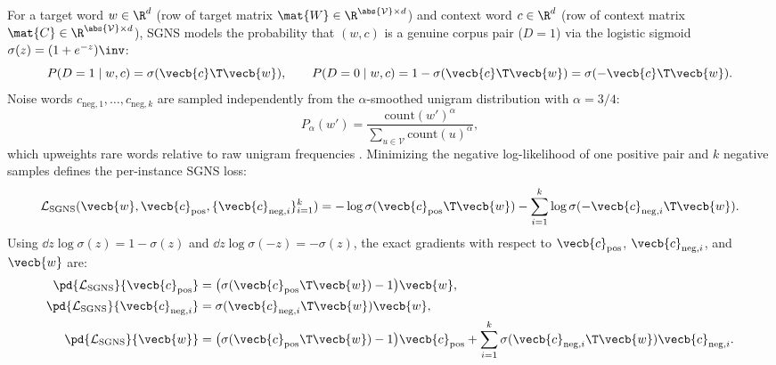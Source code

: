 \documentclass[../../../../master.tex]{subfiles}
\begin{document}
\begin{coremath}
For a target word $w \in \R^d$ (row of target matrix $\mat{W} \in \R^{\abs{\mathcal{V}}\times d}$) and context word $c \in \R^d$ (row of context matrix $\mat{C} \in \R^{\abs{\mathcal{V}}\times d}$), SGNS models the probability that $(w, c)$ is a genuine corpus pair ($D=1$) via the logistic sigmoid $\sigma(z) = (1 + e^{-z})\inv$:
\begin{equation}
  P(D=1 \mid w, c) = \sigma(\vecb{c}\T \vecb{w}), \qquad P(D=0 \mid w, c) = 1 - \sigma(\vecb{c}\T \vecb{w}) = \sigma(-\vecb{c}\T \vecb{w}).
  \label{eq:tok:sgns_prob}
\end{equation}
Noise words $c_{\mathrm{neg}, 1}, \dots, c_{\mathrm{neg}, k}$ are sampled independently from the $\alpha$-smoothed unigram distribution with $\alpha = 3/4$:
\begin{equation}
  P_\alpha(w') = \frac{\mathrm{count}(w')^\alpha}{\sum_{u \in \mathcal{V}} \mathrm{count}(u)^\alpha},
  \label{eq:tok:noise_dist}
\end{equation}
which upweights rare words relative to raw unigram frequencies . Minimizing the negative log-likelihood of one positive pair and $k$ negative samples defines the per-instance SGNS loss:
\begin{equation}
  \mathcal{L}_{\mathrm{SGNS}}(\vecb{w}, \vecb{c}_{\mathrm{pos}}, \{\vecb{c}_{\mathrm{neg},i}\}_{i=1}^k)
  = -\log \sigma(\vecb{c}_{\mathrm{pos}}\T \vecb{w}) - \sum_{i=1}^k \log \sigma(-\vecb{c}_{\mathrm{neg},i}\T \vecb{w}).
  \label{eq:tok:sgns_loss}
\end{equation}
Using $\dd{}{z}\log\sigma(z) = 1 - \sigma(z)$ and $\dd{}{z}\log\sigma(-z) = -\sigma(z)$, the exact gradients with respect to $\vecb{c}_{\mathrm{pos}}$, $\vecb{c}_{\mathrm{neg},i}$, and $\vecb{w}$ are:
\begin{align}
  \pd{\mathcal{L}_{\mathrm{SGNS}}}{\vecb{c}_{\mathrm{pos}}} &= \bigl(\sigma(\vecb{c}_{\mathrm{pos}}\T \vecb{w}) - 1\bigr)\vecb{w}, \label{eq:tok:sgns_grad_pos} \\
  \pd{\mathcal{L}_{\mathrm{SGNS}}}{\vecb{c}_{\mathrm{neg},i}} &= \sigma(\vecb{c}_{\mathrm{neg},i}\T \vecb{w})\vecb{w}, \label{eq:tok:sgns_grad_neg} \\
  \pd{\mathcal{L}_{\mathrm{SGNS}}}{\vecb{w}} &= \bigl(\sigma(\vecb{c}_{\mathrm{pos}}\T \vecb{w}) - 1\bigr)\vecb{c}_{\mathrm{pos}} + \sum_{i=1}^k \sigma(\vecb{c}_{\mathrm{neg},i}\T \vecb{w})\vecb{c}_{\mathrm{neg},i}. \label{eq:tok:sgns_grad_w}
\end{align}
\end{coremath}
\end{document}
